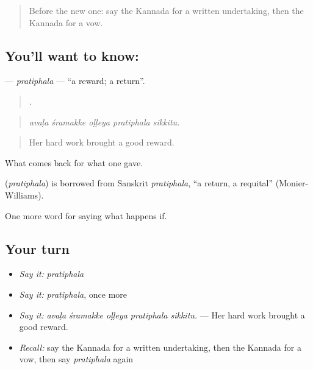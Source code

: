 \label{lesson:KA-C416-pratiphala}



\begin{quote}
Before the new one: say the Kannada for a written undertaking, then the Kannada for a vow.
\end{quote}

\subsection*{You'll want to know: }
\textbf{} — \emph{pratiphala} — \textquotedblleft{}a reward; a return\textquotedblright{}.

\begin{quote}
    .
\end{quote}

\begin{quote}
\emph{avaḷa śramakke oḷḷeya pratiphala sikkitu.}
\end{quote}

\begin{quote}
Her hard work brought a good reward.
\end{quote}

What comes back for what one gave.

\begin{cousinweb}
\textbf{} (\emph{pratiphala}) is borrowed from Sanskrit \emph{pratiphala}, \textquotedblleft{}a return, a requital\textquotedblright{} (Monier-Williams).
\end{cousinweb}

\begin{grammarlens}[title={What you've built}]
One more word for saying what happens if.
\end{grammarlens}

\subsection*{Your turn}
\begin{itemize}
\raggedright
  \item \emph{Say it:} \emph{pratiphala}
  \item \emph{Say it:} \emph{pratiphala}, once more
  \item \emph{Say it:} \emph{avaḷa śramakke oḷḷeya pratiphala sikkitu.} — Her hard work brought a good reward.
  \item \emph{Recall:} say the Kannada for a written undertaking, then the Kannada for a vow, then say \emph{pratiphala} again
\end{itemize}

